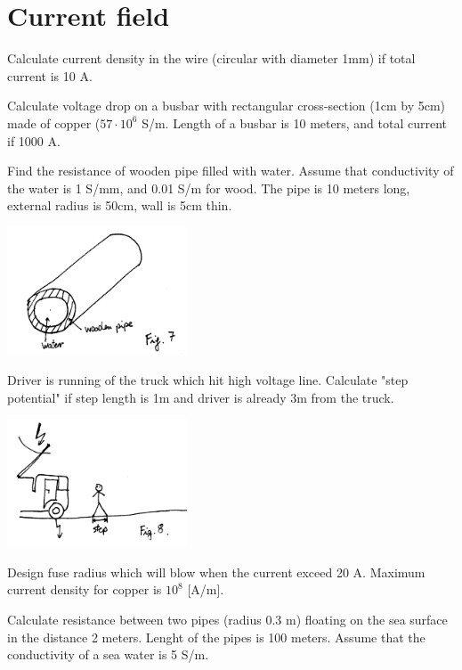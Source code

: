 \section{Current field}

\begin{Exercise}[difficulty=1]
Calculate current density in the wire (circular with diameter 1mm) if total current is 10 A.
\end{Exercise}

\begin{Exercise}[difficulty=2]
Calculate voltage drop on a busbar with rectangular cross-section (1cm by 5cm) made of copper ($57\cdot10^{6}$ S/m. Length of a busbar is 10 meters, and total current if 1000 A.
\end{Exercise}

\begin{Exercise}[difficulty=2]
Find the resistance of wooden pipe filled with water. Assume that conductivity of the water is 1 S/mm, and 0.01 S/m for wood. The pipe is 10 meters long, external radius is 50cm, wall is 5cm thin.
\begin{center}
\includegraphics[width=0.4\textwidth]{img/fig_cur1.png} 
\end{center}
\end{Exercise}

\begin{Exercise}[difficulty=3]
Driver is running of the truck which hit high voltage line. Calculate "step potential" if step length is 1m and driver is already 3m from the truck.
\begin{center}
\includegraphics[width=0.4\textwidth]{img/fig_cur2.png} 
\end{center}
\end{Exercise}

\begin{Exercise}[difficulty=2]
Design fuse radius which will blow when the current exceed 20 A. Maximum current density for copper is $10^8$ [A/m].
\end{Exercise}

\begin{Exercise}[difficulty=4]
Calculate resistance between two pipes (radius 0.3 m) floating on the sea surface in the distance 2 meters. Lenght of the pipes is 100 meters. Assume that the conductivity of a sea water is 5 S/m.
\end{Exercise}


